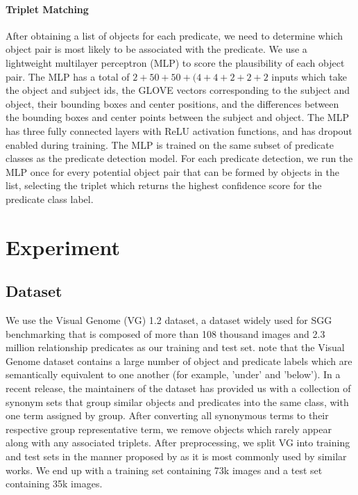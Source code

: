 \documentclass{article}
\begin{document}
\paragraph{Triplet Matching}
After obtaining a list of objects for each predicate, we need to determine which object pair is most likely to be associated with the predicate. We use a lightweight multilayer perceptron (MLP) to score the plausibility of each object pair. The MLP has a total of $2 + 50 + 50 + (4 + 4 + 2 + 2 + 2$ inputs which take the object and subject ids,
the GLOVE vectors corresponding to the subject and object, their bounding boxes and center positions, and the differences between the bounding boxes and center points between the subject and object. The MLP has three fully connected layers with ReLU activation functions, and has dropout enabled during training. The MLP is trained on the same subset of predicate classes as the predicate detection model. For each predicate detection, we run the MLP once for every potential object pair that can be formed by objects in the list, selecting the triplet which returns the highest confidence score for the predicate class label.

\section{Experiment}
\subsection{Dataset}
We use the Visual Genome (VG) 1.2 dataset, a dataset widely used for SGG benchmarking that is composed of more than 108 thousand images and 2.3 million relationship predicates \cite{krishna2017visual} as our training and test set.
note that the Visual Genome dataset contains a large number of object and predicate labels which are semantically equivalent to one another (for example, 'under' and 'below'). In a recent release, the maintainers of the dataset has provided us with a collection of synonym sets that group similar objects and predicates into the same class, with one term assigned by group. After converting all synonymous terms to their respective group representative term, we remove objects which rarely appear along with any associated triplets. 
After preprocessing, we split VG into training and test sets in the manner proposed by \cite{xu2017scene} as it is most commonly used by similar works\cite{cong2023reltr,yang2018graph}. We end up with a training set containing 73k images and a test set containing 35k images. 
\end{document}
